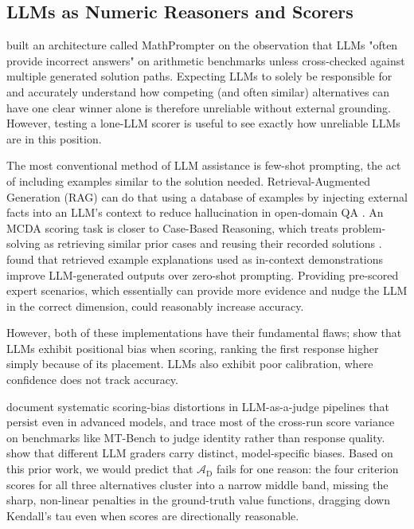 \documentclass[a4paper,fleqn]{cas-dc}
\begin{document}
\subsection{LLMs as Numeric Reasoners and Scorers}

\citet{imani2023mathprompter} built an architecture called MathPrompter on the observation that LLMs "often provide incorrect answers" on arithmetic benchmarks unless cross-checked against multiple generated solution paths. Expecting LLMs to solely be responsible for and accurately understand how competing (and often similar) alternatives can have one clear winner alone is therefore unreliable without external grounding. However, testing a lone-LLM scorer is useful to see exactly how unreliable LLMs are in this position.

The most conventional method of LLM assistance is few-shot prompting, the act of including examples similar to the solution needed. Retrieval-Augmented Generation (RAG) can do that using a database of examples by injecting external facts into an LLM's context to reduce hallucination in open-domain QA \citep{lewis2020}. An MCDA scoring task is closer to Case-Based Reasoning, which treats problem-solving as retrieving similar prior cases and reusing their recorded solutions \citep{aamodtplaza1994}. \citet{minorkaucher2024} found that retrieved example explanations used as in-context demonstrations improve LLM-generated outputs over zero-shot prompting. Providing pre-scored expert scenarios, which essentially can provide more evidence and nudge the LLM in the correct dimension, could reasonably increase accuracy.

However, both of these implementations have their fundamental flaws; \citet{wang2024fairescalers} show that LLMs exhibit positional bias when scoring, ranking the first response higher simply because of its placement. LLMs also exhibit poor calibration, where confidence does not track accuracy.

\citet{li2026scoringbias} document systematic scoring-bias distortions in LLM-as-a-judge pipelines that persist even in advanced models, and \citet{zhu2026cyclicjudge} trace most of the cross-run score variance on benchmarks like MT-Bench to judge identity rather than response quality. \citet{policar2025bioinformatics} show that different LLM graders carry distinct, model-specific biases. Based on this prior work, we would predict that $\mathcal{A}_{\text{D}}$ fails for one reason: the four criterion scores for all three alternatives cluster into a narrow middle band, missing the sharp, non-linear penalties in the ground-truth value functions, dragging down Kendall's tau even when scores are directionally reasonable.
\end{document}
